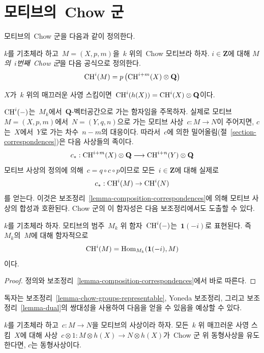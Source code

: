 \section{모티브의\  Chow 군}
\label{section-chow-groups-motives}

\noindent
모티브의\  Chow 군을 다음과 같이 정의한다.

\begin{definition}
\label{definition-chow-group-motives}
$k$를 기초체라 하고\  $M = (X, p, m)$을\  $k$ 위의\  Chow 모티브라 하자.
$i \in \mathbf{Z}$에 대해 {\it $M$의\  $i$번째\  Chow 군}을 다음 공식으로
정의한다.
$$
\mathop{\mathrm{CH}}\nolimits^i(M) = p\left(\mathop{\mathrm{CH}}\nolimits^{i + m}(X) \otimes \mathbf{Q}\right)
$$
\end{definition}

\noindent
$X$가\  $k$ 위의 매끄러운 사영 스킴이면\ 
$\mathop{\mathrm{CH}}\nolimits^i(h(X)) = \mathop{\mathrm{CH}}\nolimits^i(X) \otimes \mathbf{Q}$이다.

\medskip\noindent
$\mathop{\mathrm{CH}}\nolimits^i(-)$는\  $M_k$에서\  $\mathbf{Q}$-벡터공간으로 가는 함자임을
주목하자. 실제로 모티브\  $M = (X, p, m)$에서\ 
$N = (Y, q, n)$으로 가는 모티브 사상\  $c : M \to N$이 주어지면,
$c$는\  $X$에서\  $Y$로 가는 차수\  $n - m$의 대응이다.
따라서\  $c$에 의한 밀어올림(절\  \ref{section-correspondences})은
다음 사상들의 족이다.
$$
c_* :
\mathop{\mathrm{CH}}\nolimits^{i + m}(X) \otimes \mathbf{Q}
\longrightarrow
\mathop{\mathrm{CH}}\nolimits^{i + n}(Y) \otimes \mathbf{Q}
$$
모티브 사상의 정의에 의해\  $c = q \circ c \circ p$이므로 모든\ 
$i \in \mathbf{Z}$에 대해 실제로
$$
c_* : \mathop{\mathrm{CH}}\nolimits^i(M) \to \mathop{\mathrm{CH}}\nolimits^i(N)
$$
를 얻는다. 이것은 보조정리\ 
\ref{lemma-composition-correspondences}에 의해 모티브 사상의 합성과
호환된다. Chow 군의 이 함자성은 다음 보조정리에서도 도출할 수 있다.

\begin{lemma}
\label{lemma-chow-groups-representable}
$k$를 기초체라 하자. 모티브의 범주\  $M_k$ 위 함자\  $\mathop{\mathrm{CH}}\nolimits^i(-)$는\ 
$\mathbf{1}(-i)$로 표현된다. 즉\  $M_k$의\  $M$에 대해 함자적으로
$$
\mathop{\mathrm{CH}}\nolimits^i(M) = \mathop{\mathrm{Hom}}\nolimits_{M_k}(\mathbf{1}(-i), M)
$$
이다.
\end{lemma}

\begin{proof}
정의와 보조정리\  \ref{lemma-composition-correspondences}에서 바로 따른다.
\end{proof}

\noindent
독자는 보조정리\  \ref{lemma-chow-groups-representable}, Yoneda 보조정리,
그리고 보조정리\  \ref{lemma-dual}의 쌍대성을 사용하여 다음을 얻을 수
있음을 예상할 수 있다.

\begin{lemma}[Manin]
\label{lemma-manin}
$k$를 기초체라 하고\  $c : M \to N$을 모티브의 사상이라 하자.
모든\  $k$ 위 매끄러운 사영 스킴\  $X$에 대해 사상\ 
$c \otimes 1 : M \otimes h(X) \to N \otimes h(X)$가\  Chow 군 위
동형사상을 유도한다면, $c$는 동형사상이다.
\end{lemma}

